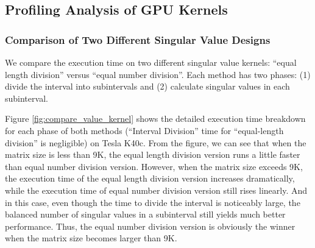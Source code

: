 \subsection{Profiling Analysis of GPU Kernels}

\subsubsection{Comparison of Two Different Singular Value Designs}
We compare the execution time on two different singular value kernels:
``equal length division'' versus ``equal number division''. Each
method has two phases: (1) divide the interval into subintervals and
(2) calculate singular values in each subinterval.
\begin{figure}[hbpt]
\vspace{-0.3in}
\centering
\vspace{-0.1in}
\end{figure}
Figure \ref{fig:compare_value_kernel} shows the detailed execution time breakdown for each phase of both methods (``Interval Division'' time for ``equal-length division'' is negligible) on Tesla K40c.
From the figure, we can see that when the matrix size is less than 9K, the equal length division version runs a little faster than equal number division version.
However, when the matrix size exceeds 9K, the execution time of the equal length division version increases dramatically, while the execution time of equal number division version still rises linearly.
And in this case, 
even though the time to divide the interval is noticeably
large, the balanced number of singular values in a subinterval
still yields much better performance.
Thus, the equal number division version is obviously the winner when the matrix size becomes larger than 9K.

